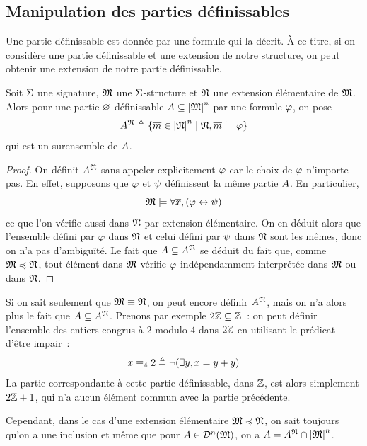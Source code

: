 \subsection{Manipulation des parties définissables}

Une partie définissable est donnée par une formule qui la décrit. \`A ce titre,
si on considère une partie définissable et une extension de notre structure,
on peut obtenir une extension de notre partie définissable.

\begin{definition}
  Soit $\Sigma$ une signature, $\mathfrak{M}$ une $\Sigma$-structure et
  $\mathfrak{N}$ une extension élémentaire de $\mathfrak{M}$. Alors pour une
  partie $\varnothing$-définissable $A\subseteq\left\vert \mathfrak{M}\right\vert^n$ par une formule
  $\varphi$, on pose
  \[A^{\mathfrak{N}} \triangleq
  \left\{ \overline{m}\in\left\vert \mathfrak{N}\right\vert^n \;\middle\vert\; \mathfrak{N},\overline{m}\models\varphi \right\}\]
  qui est un surensemble de $A$.
\end{definition}

\begin{proof}
  On définit $A^{\mathfrak{N}}$ sans appeler explicitement $\varphi$ car le choix
  de $\varphi$ n'importe pas. En effet, supposons que $\varphi$ et $\psi$
  définissent la même partie $A$. En particulier,
  \[\mathfrak{M}\models\forall \overline{x}, (\varphi \mathrel{\leftrightarrow}\psi)\]
  ce que l'on vérifie aussi dans $\mathfrak{N}$ par extension élémentaire. On en
  déduit alors que l'ensemble défini par $\varphi$ dans $\mathfrak{N}$ et celui
  défini par $\psi$ dans $\mathfrak{N}$ sont les mêmes, donc on n'a pas
  d'ambiguïté. Le fait que $A\subseteq A^{\mathfrak{N}}$ se déduit du fait
  que, comme $\mathfrak{M}\preccurlyeq\mathfrak{N}$, tout élément dans $\mathfrak{M}$ vérifie
  $\varphi$ indépendamment interprétée dans $\mathfrak{M}$ ou dans $\mathfrak{N}$.
\end{proof}

\begin{remark}
  Si on sait seulement que $\mathfrak{M}\equiv\mathfrak{N}$, on peut encore définir
  $A^{\mathfrak{N}}$, mais on n'a alors plus le fait que
  $A\subseteq A^{\mathfrak{N}}$. Prenons par exemple
  $2\mathbb Z\subseteq\mathbb Z$~: on peut définir l'ensemble des entiers congrus à
  $2$ modulo $4$ dans $2\mathbb Z$ en utilisant le prédicat d'être impair~:
  \[x \equiv_{4} 2 \triangleq \lnot(\exists y, x = y + y)\]
  La partie correspondante à cette partie définissable, dans $\mathbb Z$, est alors
  simplement $2\mathbb Z+1$, qui n'a aucun élément commun avec la partie précédente.

  Cependant, dans le cas d'une extension élémentaire $\mathfrak{M}\preccurlyeq\mathfrak{N}$,
  on sait toujours qu'on a une inclusion et même que pour
  $A\in\mathcal{D}^n(\mathfrak{M})$, on a $A = A^{\mathfrak{N}}\cap \left\vert \mathfrak{M}\right\vert^n$.
\end{remark}

